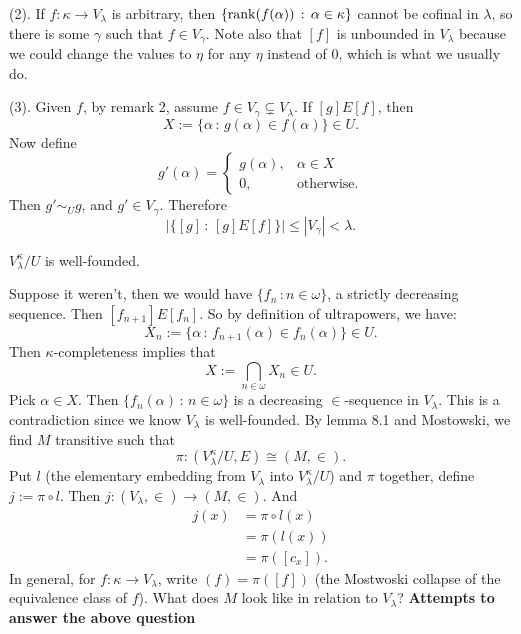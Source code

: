 \documentclass{article}
\begin{document}
\begin{remark*}(2).
    If $f : \kappa \to V_{\lambda}$ is arbitrary, then $\{ \rank(f(\alpha)) \, : \, \alpha \in \kappa\}$ cannot be cofinal in $\lambda$, so there is some $\gamma$ such that $f \in V_{\gamma}$. Note also that $[f]$ is unbounded in $V_{\lambda}$ because we could change the  values to $\eta$ for any $\eta$ instead of $0$, which is what we usually do.
\end{remark*}
\begin{remark*}(3).
    Given $f$, by remark 2, assume $f \in V_{\gamma} \subsetneq V_{\lambda}$. If $[g]E[f]$, then \[ X := \{ \alpha \, : \, g(\alpha) \in f(\alpha) \} \in U.\] Now define \[ g'(\alpha) = \begin{cases}
        g(\alpha), & \alpha \in X\\
        0, & \text{otherwise.}
    \end{cases}\]
    Then $g' \sim_{U} g$, and $g' \in V_{\gamma}$. Therefore \[ \left|\{ [g] \, : \, [g] E [f] \} \right| \leq |V_{\gamma}| < \lambda.\]
\end{remark*}
\begin{fancylem}{}
    $V_{\lambda}^{\kappa}/U$ is well-founded.
\end{fancylem}
\proof Suppose it weren't, then we would have $\{f_{n} \, : n \in \omega\}$, a strictly decreasing sequence. Then $[f_{n+1}]E[f_{n}]$. So by definition of ultrapowers, we have: \[ X_{n} := \{ \alpha \, : \, f_{n+1}(\alpha) \in f_{n}(\alpha)\} \in U.\]
Then $\kappa$-completeness implies that \[ X := \bigcap_{n \in \omega} X_{n} \in U.\] Pick $\alpha \in X$. Then $\{ f_{n}(\alpha) \, : \, n \in \omega\}$ is a decreasing $\in$-sequence in $V_{\lambda}$. This is a contradiction since we know $V_{\lambda}$ is well-founded.\endproof 
By lemma 8.1 and Mostowski, we find $M$ transitive such that \[ \pi : (V_{\lambda}^{\kappa}/U, E) \cong (M, \in).\]
Put $l$ (the elementary embedding from $V_{\lambda}$ into $V_{\lambda}^{\kappa}/U$) and $\pi$ together, define $j := \pi \circ l$. Then $j : (V_{\lambda}, \in) \to (M, \in)$. And \begin{align*} j(x) &= \pi \circ l(x)\\ &= \pi(l(x)) \\ &=\pi([c_{x}]).\end{align*} In general, for $f: \kappa \to V_{\lambda}$, write $(f) = \pi([f])$ (the Mostwoski collapse of the equivalence class of $f$). What does $M$ look like in relation to $V_{\lambda}$? \gap \large 
\textbf{Attempts to answer the above question}\normalsize
\end{document}
